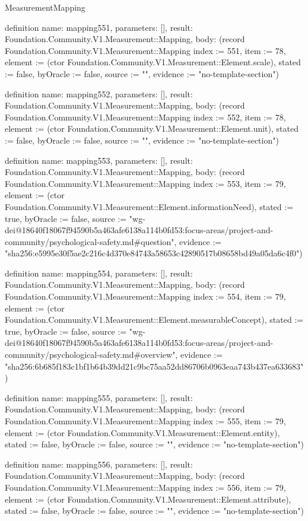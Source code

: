 \begin{lexlean}{MeasurementMapping}
\begin{semanticmodule}
definition{
  name: mapping551,
  parameters: [],
  result: Foundation.Community.V1.Measurement::Mapping,
  body: (record Foundation.Community.V1.Measurement::Mapping {index := 551, item := 78, element := (ctor Foundation.Community.V1.Measurement::Element.scale), stated := false, byOracle := false, source := "", evidence := "no-template-section"})
}

definition{
  name: mapping552,
  parameters: [],
  result: Foundation.Community.V1.Measurement::Mapping,
  body: (record Foundation.Community.V1.Measurement::Mapping {index := 552, item := 78, element := (ctor Foundation.Community.V1.Measurement::Element.unit), stated := false, byOracle := false, source := "", evidence := "no-template-section"})
}

definition{
  name: mapping553,
  parameters: [],
  result: Foundation.Community.V1.Measurement::Mapping,
  body: (record Foundation.Community.V1.Measurement::Mapping {index := 553, item := 79, element := (ctor Foundation.Community.V1.Measurement::Element.informationNeed), stated := true, byOracle := false, source := "wg-dei@18640f18067f94590b5a463afe6138a114b0fd53:focus-areas/project-and-community/psychological-safety.md#question", evidence := "sha256:e5995e30f5ae2c216c4d370e84743a58653c42890517b08658bd49a05da6c4f0"})
}

definition{
  name: mapping554,
  parameters: [],
  result: Foundation.Community.V1.Measurement::Mapping,
  body: (record Foundation.Community.V1.Measurement::Mapping {index := 554, item := 79, element := (ctor Foundation.Community.V1.Measurement::Element.measurableConcept), stated := true, byOracle := false, source := "wg-dei@18640f18067f94590b5a463afe6138a114b0fd53:focus-areas/project-and-community/psychological-safety.md#overview", evidence := "sha256:6b685f183c1bf1b64b39dd21c9bc75aa52dd86706b0963eaa743b437ea633683"})
}

definition{
  name: mapping555,
  parameters: [],
  result: Foundation.Community.V1.Measurement::Mapping,
  body: (record Foundation.Community.V1.Measurement::Mapping {index := 555, item := 79, element := (ctor Foundation.Community.V1.Measurement::Element.entity), stated := false, byOracle := false, source := "", evidence := "no-template-section"})
}

definition{
  name: mapping556,
  parameters: [],
  result: Foundation.Community.V1.Measurement::Mapping,
  body: (record Foundation.Community.V1.Measurement::Mapping {index := 556, item := 79, element := (ctor Foundation.Community.V1.Measurement::Element.attribute), stated := false, byOracle := false, source := "", evidence := "no-template-section"})
}


\end{semanticmodule}
\end{lexlean}
